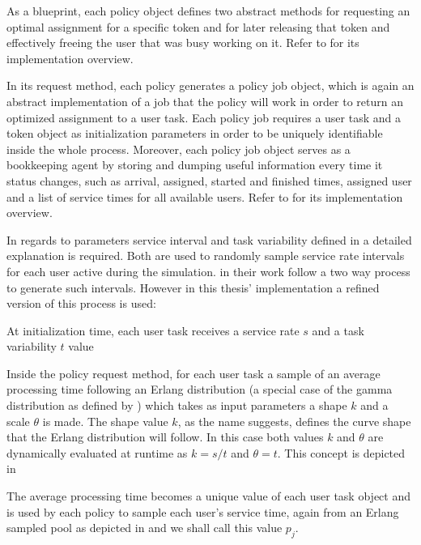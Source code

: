 As a blueprint, each policy object defines two abstract methods for requesting an optimal assignment for a specific token and for later releasing that token and effectively freeing the user that was busy working on it. Refer to  for its implementation overview.


In its request method, each policy generates a policy job object, which is again an abstract implementation of a job that the policy will work in order to return an optimized assignment to a user task. Each policy job requires a user task and a token object as initialization parameters in order to be uniquely identifiable inside the whole process. Moreover, each policy job object serves as a bookkeeping agent by storing and dumping useful information every time it status changes, such as arrival, assigned, started and finished times, assigned user and a list of service times for all available users. Refer to  for its implementation overview.


In regards to parameters service interval and task variability defined in  a detailed explanation is required. Both are used to randomly sample service rate intervals for each user active during the simulation. \citet[p. 8]{Zeng2005} in their work follow a two way process to generate such intervals. However in this thesis' implementation a refined version of this process is used:
\begin{enumerate*}
	\item At initialization time, each user task receives a service rate $s$ and a task variability $t$ value
	\item Inside the policy request method, for each user task a sample of an average processing time following an Erlang distribution (a special case of the gamma distribution as defined by \citet{Adan2016}) which takes as input parameters a shape $k$ and a scale $\theta$ is made. The shape value $k$, as the name suggests, defines the curve shape that the Erlang distribution will follow. In this case both values $k$ and $\theta$ are dynamically evaluated at runtime as $k=s/t$ and $\theta = t$. This concept is depicted in 
	\item The average processing time becomes a unique value of each user task object and is used by each policy to sample each user's service time, again from an Erlang sampled pool as depicted in  and we shall call this value $p_j$.
\end{enumerate*}

